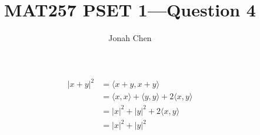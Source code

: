 \documentclass[a4paper]{article}
\title{MAT257 PSET 1---Question 4}
\author{Jonah Chen}
\numberwithin{equation}{section}
\begin{document}
\sffamily
\begin{align*}
    |x+y|^2&=\langle x+y,x+y\rangle\\
    &=\langle x,x\rangle+\langle y,y\rangle+2\langle x,y\rangle\\
    &=|x|^2+|y|^2+2\langle x,y\rangle\\
    &=|x|^2+|y|^2
\end{align*}
\end{document}
